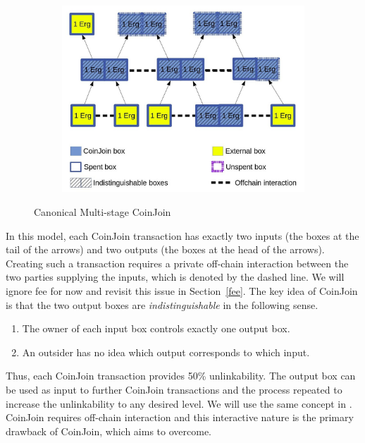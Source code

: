 \documentclass[runningheads]{llncs}
\begin{document}
\begin{figure}[h]
	\centering
	\begin{subfigure}{.575\textwidth}
		\centering
		\includegraphics[width=\linewidth]{CoinJoin.jpg}
	\end{subfigure}%
	\caption{Canonical Multi-stage CoinJoin}
	\label{fig:coinjoin}
\end{figure}

In this model, each CoinJoin transaction has exactly two inputs (the boxes at the tail of the arrows) and two outputs (the boxes at the head of the arrows). Creating such a transaction requires a private off-chain interaction between the two parties supplying the inputs, which is denoted by the dashed line. We will ignore fee for now and revisit this issue in Section~\ref{fee}.
The key idea of CoinJoin is that the two output boxes are {\em indistinguishable} in the following sense. 
\begin{enumerate}
    \item The owner of each input box controls exactly one output box.
    \item An outsider has no idea which output corresponds to which input.
\end{enumerate}

Thus, each CoinJoin transaction provides 50\% unlinkability. The output box can be used as input to further CoinJoin transactions and the process repeated to increase the unlinkability to any desired level. We will use the same concept in \algname. 
CoinJoin requires off-chain interaction and this interactive nature is the primary drawback of CoinJoin, which \algname aims to overcome. 
\end{document}
